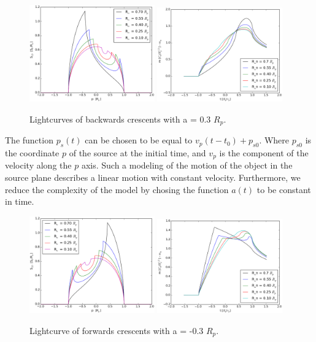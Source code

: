 \begin{figure}
\centering
	\includegraphics[width = 0.48\textwidth]{plots/4rn_profile.eps}
	\includegraphics[width = 0.48\textwidth]{plots/4rn_magnification.eps}
\caption{\label{fig:lightcurve_crescent_back} Lightcurves of backwards crescents with  a = 0.3 $R_p$.}
\end{figure}

The function $p_s(t)$ can be chosen to be equal to $v_p(t-t_0) + p_{s0}$. Where $p_{s0}$ is the coordinate $p$ of the source at the initial time, and $v_p$ is the component of the velocity
along the $p$ axis. Such a modeling of the motion of the object in the source plane describes a linear motion with constant velocity. Furthermore, we reduce the complexity of the model by 
chosing the function $a(t)$ to be constant in time.  

\begin{figure}
\centering
	\includegraphics[width = 0.48\textwidth]{plots/4rn2_profile.eps}
	\includegraphics[width = 0.48\textwidth]{plots/4rn2_magnification.eps}
\caption{\label{fig:lightcurve_crescent} Lightcurve of forwards crescents with a = -0.3 $R_p$.}
\end{figure}

